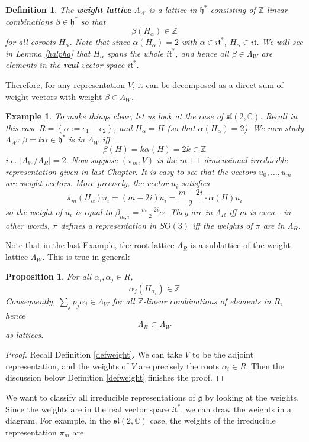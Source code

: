 \documentclass[11pt]{book}
\newtheorem{proposition}[theorem]{Proposition}
\newtheorem{example}[theorem]{Example}
\newtheorem{definition}[theorem]{Definition}
\newcommand{\bb}[1]{\mathbb{#1}}
\newcommand{\mf}[1]{\mathfrak{#1}}
\begin{document}
\begin{definition}
The \textbf{weight lattice} $\Lambda_W$ is a lattice in $\mf{h}^*$ consisting of $\bb{Z}$-linear combinations $\beta \in \mf{h}^*$ so that
$$\beta(H_{\alpha}) \in \bb{Z}$$
for all coroots $H_{\alpha}$. Note that since $\alpha(H_{\alpha}) = 2$ with $\alpha \in i\mf{t}^*$, $H_{\alpha} \in i\mf{t}$. We will see in Lemma \ref{halpha} that $H_{\alpha}$ spans the whole $i\mf{t}^*$, and hence all $\beta \in \Lambda_W$ are elements in the \textbf{real} vector space $i \mf{t}^*$.
\end{definition}
Therefore, for any representation $V$, it can be decomposed as a direct sum of weight vectors with weight $\beta \in \Lambda_W$.
\begin{example}
To make things clear, let us look at the case of $\mf{sl}(2,\bb{C})$. Recall in this case $R = \left\{\alpha := \epsilon_1 - \epsilon_2\right\}$, and $H_{\alpha} = H$ (so that $\alpha(H_{\alpha}) = 2$). We now study $\Lambda_W$: $\beta = k\alpha \in \mf{h}^*$ is in $\Lambda_W$ iff
$$\beta(H) = k\alpha(H) = 2k \in \bb{Z}$$
i.e. $|\Lambda_W/\Lambda_R| = 2$. Now suppose $(\pi_m, V)$ is the $m+1$ dimensional irreducible representation given in last Chapter. It is easy to see that the vectors $u_0, \dots, u_m$ are weight vectors. More precisely, the vector $u_i$ satisfies
$$\pi_m(H_{\alpha})u_i = (m-2i)u_i = \frac{m-2i}{2} \cdot \alpha(H) u_i$$
so the weight of $u_i$ is equal to $\beta_{m,i} = \frac{m-2i}{2}\alpha$. They are in $\Lambda_R$ iff $m$ is even - in other words, $\pi$ defines a representation in $SO(3)$ iff the weights of $\pi$ are in $\Lambda_R$.
\end{example}
Note that in the last Example, the root lattice $\Lambda_R$ is a sublattice of the weight lattice $\Lambda_W$. This is true in general:
\begin{proposition} \label{wtroot}
For all $\alpha_i, \alpha_j \in R$,
$$\alpha_j(H_{\alpha_i}) \in \bb{Z}$$
Consequently, $\sum_j p_j \alpha_j \in \Lambda_W$ for all $\bb{Z}$-linear combinations of elements in $R$, hence
$$\Lambda_R \subset \Lambda_W$$
as lattices.
\end{proposition}
\begin{proof}
Recall Definition \ref{defweight}. We can take $V$ to be the adjoint representation, and the weights of $V$ are precisely the roots $\alpha_i \in R$. Then the discussion below Definition \ref{defweight} finishes the proof.
\end{proof}
We want to classify all irreducible representations of $\mf{g}$ by looking at the weights. Since the weights are in the real vector space $i \mf{t}^*$, we can draw the weights in a diagram. For example, in the $\mf{sl}(2,\bb{C})$ case, the weights of the irreducible representation $\pi_m$ are
\end{document}
